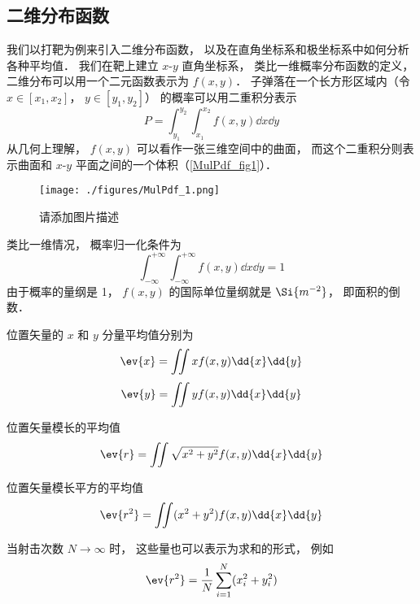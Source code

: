 


\subsection{二维分布函数}
我们以打靶为例来引入二维分布函数， 以及在直角坐标系和极坐标系中如何分析各种平均值． 我们在靶上建立 $x$-$y$ 直角坐标系， 类比一维概率分布函数的定义， 二维分布可以用一个二元函数表示为 $f(x, y)$． 子弹落在一个长方形区域内（令 $x \in [x_1, x_2]$， $y \in [y_1, y_2]$） 的概率可以用二重积分表示
\begin{equation}
P = \int_{y_1}^{y_2} \int_{x_1}^{x_2} f(x, y) \dd{x} \dd{y}
\end{equation}
从几何上理解， $f(x, y)$ 可以看作一张三维空间中的曲面， 而这个二重积分则表示曲面和 $x$-$y$ 平面之间的一个体积（\autoref{MulPdf_fig1}）．

\begin{figure}[ht]
\centering
\texttt{[image: ./figures/MulPdf\_1.png]}
\caption{请添加图片描述} \label{MulPdf_fig1}
\end{figure}

类比一维情况， 概率归一化条件为
\begin{equation}
\int_{-\infty}^{+\infty} \int_{-\infty}^{+\infty} f(x, y) \dd{x} \dd{y} = 1
\end{equation}
由于概率的量纲是 1， $f(x, y)$ 的国际单位量纲就是 $\Si{m^{-2}}$， 即面积的倒数．

位置矢量的 $x$ 和 $y$ 分量平均值分别为
\begin{equation}\label{MulPdf_eq2}
\ev{x} = \iint x f(x, y) \dd{x}\dd{y}
\end{equation}
\begin{equation}
\ev{y} = \iint y f(x, y) \dd{x}\dd{y}
\end{equation}

位置矢量模长的平均值
\begin{equation}
\ev{r} = \iint \sqrt{x^2 + y^2} f(x, y) \dd{x}\dd{y}
\end{equation}

位置矢量模长平方的平均值
\begin{equation}
\ev{r^2} = \iint (x^2 + y^2) f(x, y) \dd{x}\dd{y}
\end{equation}

当射击次数 $N \to \infty$ 时， 这些量也可以表示为求和的形式， 例如
\begin{equation}
\ev{r^2} = \frac{1}{N}\sum_{i=1}^N (x_i^2 + y_i^2)
\end{equation}

